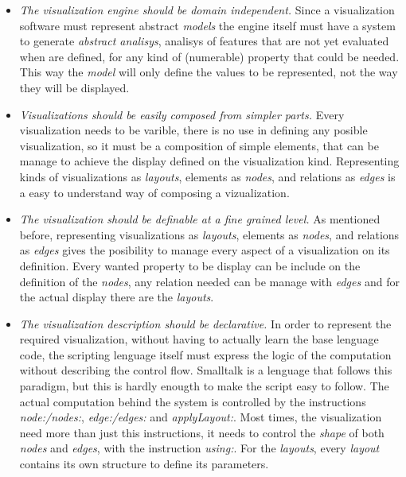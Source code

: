 \documentclass[runningheads]{llncs}
\begin{document}
\begin{itemize}
\item \emph{The visualization engine should be domain independent.}
Since a visualization software must represent abstract \emph{models}
the engine itself must have a system to generate \emph{abstract analisys},
analisys of features that are not yet evaluated when are defined, 
for any kind of (numerable) property that could be needed. This way
the \emph{model} will only define the values to be represented, not
the way they will be displayed.

\item \emph{Visualizations should be easily composed from simpler parts.}
Every visualization needs to be varible, there is no use in  defining
any posible visualization, so it must be a composition of simple elements,
that can be manage to achieve the display defined on the visualization kind.
Representing kinds of visualizations as \emph{layouts}, elements as \emph{nodes},
and relations as \emph{edges} is a easy to understand way of composing a
vizualization.
 
\item \emph{The visualization should be definable at a fine grained level.}
As mentioned before, representing visualizations as \emph{layouts}, elements as 
\emph{nodes}, and relations as \emph{edges} gives the posibility to 
manage every aspect of a visualization on its definition. Every wanted
property to be display can be include on the definition of the \emph{nodes},
any relation needed can be manage with \emph{edges} and for the actual display
there are the \emph{layouts}.

\item \emph{The visualization description should be declarative.}
In order to represent the required visualization, without having to 
actually learn the base lenguage code, the scripting lenguage itself
must express the logic of the computation without describing the control 
flow. Smalltalk is a lenguage that follows this paradigm, but this is
hardly enougth to make the script easy to follow. The actual computation
behind the system is controlled by the instructions \emph{node:/nodes:}, 
\emph{edge:/edges:} and \emph{applyLayout:}. Most times, the visualization
need more than just this instructions, it needs to control the \emph{shape}
of both \emph{nodes} and \emph{edges}, with the instruction \emph{using:}. 
For the \emph{layouts}, every \emph{layout} contains its own structure to 
define its parameters.   
\end{itemize}
\end{document}
